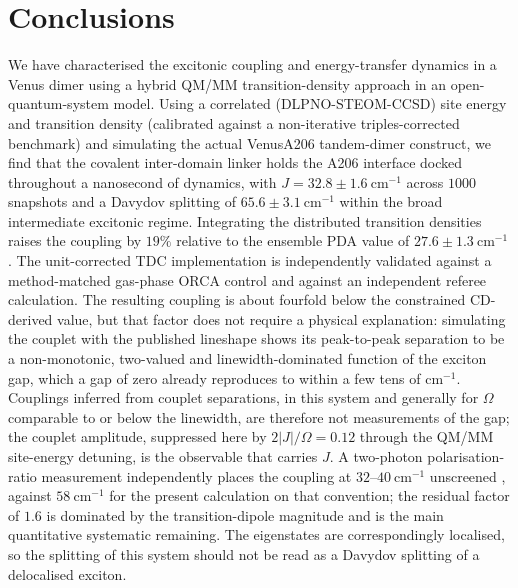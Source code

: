 \documentclass[journal=jpcbfk, manuscript=article, layout=twocolumn, doi=true]{achemso}
\begin{document}
\section{Conclusions}

We have characterised the excitonic coupling and energy-transfer dynamics in a Venus dimer using a hybrid QM/MM transition-density approach in an open-quantum-system model. Using a correlated (DLPNO-STEOM-CCSD) site energy and transition density (calibrated against a non-iterative triples-corrected benchmark) and simulating the actual VenusA206 tandem-dimer construct, we find that the covalent inter-domain linker holds the A206 interface docked throughout a nanosecond of dynamics, with $J=32.8\pm1.6~\mathrm{cm^{-1}}$ across $1000$ snapshots and a Davydov splitting of $65.6\pm3.1~\mathrm{cm^{-1}}$ within the broad intermediate excitonic regime. Integrating the distributed transition densities raises the coupling by $19\%$ relative to the ensemble PDA value of $27.6\pm1.3~\mathrm{cm^{-1}}$. The unit-corrected TDC implementation is independently validated against a method-matched gas-phase ORCA control and against an independent referee calculation. The resulting coupling is about fourfold below the constrained CD-derived value, but that factor does not require a physical explanation: simulating the couplet with the published lineshape shows its peak-to-peak separation to be a non-monotonic, two-valued and linewidth-dominated function of the exciton gap, which a gap of zero already reproduces to within a few tens of $\mathrm{cm^{-1}}$. Couplings inferred from couplet separations, in this system and generally for $\Omega$ comparable to or below the linewidth, are therefore not measurements of the gap; the couplet amplitude, suppressed here by $2|J|/\Omega=0.12$ through the QM/MM site-energy detuning, is the observable that carries $J$. A two-photon polarisation-ratio measurement independently places the coupling at $32$--$40~\mathrm{cm^{-1}}$ unscreened \cite{cusick2026twophoton}, against $58~\mathrm{cm^{-1}}$ for the present calculation on that convention; the residual factor of $1.6$ is dominated by the transition-dipole magnitude and is the main quantitative systematic remaining. The eigenstates are correspondingly localised, so the splitting of this system should not be read as a Davydov splitting of a delocalised exciton.
\end{document}

